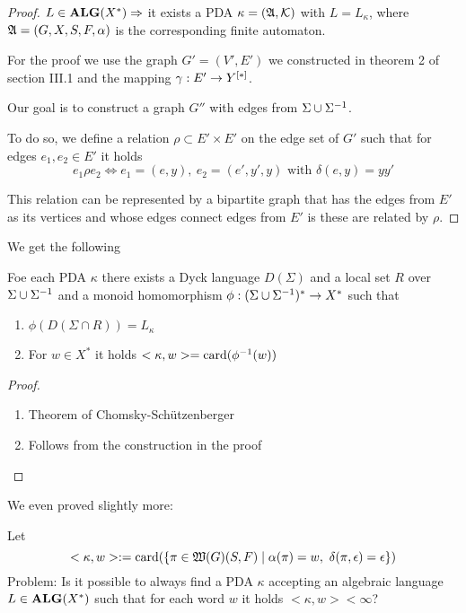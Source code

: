 \begin{proof}
$L\in \mbox{{\bf ALG}}(X^*) \Rightarrow$ it exists a PDA $\kappa=(\mbox{$\mathfrak{A}$},\mbox{$\mathcal{K}$})$ with
$L = L_\kappa$, where $\mbox{$\mathfrak{A}$}=(G, X, S, F, \alpha)$ is the corresponding finite
automaton.

For the proof we use the graph $G'=(V',E')$ we constructed in theorem 2 of
section III.1 and the mapping $\gamma: E' \to \mbox{${Y}^{[*]}$}$.

Our goal is to construct a graph $G''$ with edges from $\Sigma \cup {\Sigma}^{-1}$.

To do so, we define a relation $\rho \subset E'\times E'$ on the edge set of
$G'$ such that for edges $e_1, e_2\in E'$ it holds
\[ e_1 \rho e_2 \iff e_1 = (e, y),\ e_2 = (e', y', y)\text{ with }\delta(e, y) =
yy' \]

This relation can be represented by a bipartite graph that has the edges from
$E'$ as its vertices and whose edges connect edges from $E'$ is these are
related by $\rho$.

\end{proof}

We get the following
\begin{corollary}
Foe each PDA $\kappa$ there exists a Dyck language $D(\Sigma)$ and a local set
$R$ over $\Sigma \cup {\Sigma}^{-1}$ and a monoid homomorphism $\phi:
(\Sigma \cup {\Sigma}^{-1})^* \to X^*$ such that
\begin{enumerate}
  \item $\phi(D(\Sigma\cap R)) = L_\kappa$
  \item For $w\in X^*$ it holds $<\kappa, w> = \mathrm{card}(\phi^{-1}(w))$
\end{enumerate}
\end{corollary}

\begin{proof}
\begin{enumerate}
  \item Theorem of Chomsky-Schützenberger
  \item Follows from the construction in the proof
\end{enumerate}
\end{proof}

We even proved slightly more:

Let \[ <\kappa, w> := \mathrm{card}(\mbox{$\{\pi\in\mbox{$\mathfrak{W}(G)$}(S,F)\mid
\alpha(\pi)=w,\ \delta(\pi,\epsilon)=\epsilon\}$})
\]
Problem: Is it possible to always find a PDA $\kappa$ accepting an algebraic
language $L \in \mbox{{\bf ALG}}(X^*)$ such that for each word $w$ it holds $<\kappa, w> <
\infty$?

